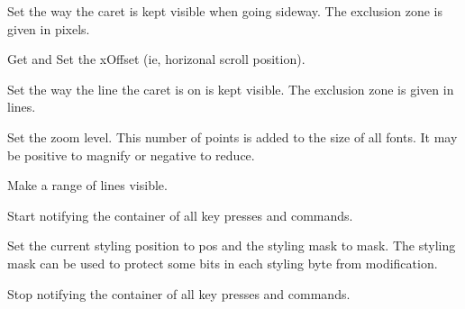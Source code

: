 
Set the way the caret is kept visible when going sideway.
The exclusion zone is given in pixels.


\label{wxstyledtextctrlsetxoffset}


Get and Set the xOffset (ie, horizonal scroll position).


\label{wxstyledtextctrlsetycaretpolicy}


Set the way the line the caret is on is kept visible.
The exclusion zone is given in lines.


\label{wxstyledtextctrlsetzoom}


Set the zoom level. This number of points is added to the size of all fonts.
It may be positive to magnify or negative to reduce.


\label{wxstyledtextctrlshowlines}


Make a range of lines visible.


\label{wxstyledtextctrlstartrecord}


Start notifying the container of all key presses and commands.


\label{wxstyledtextctrlstartstyling}


Set the current styling position to pos and the styling mask to mask.
The styling mask can be used to protect some bits in each styling byte from modification.


\label{wxstyledtextctrlstoprecord}


Stop notifying the container of all key presses and commands.


